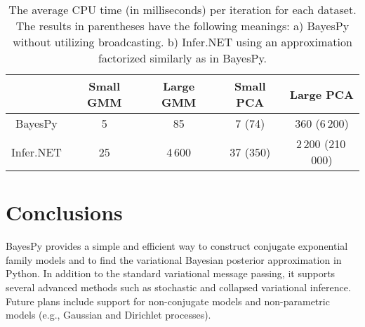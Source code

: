\documentclass[twoside,11pt]{article}
\begin{document}
\begin{table}[tb]
  \centering
  \caption{
    The average CPU time (in milliseconds) per iteration for each
    dataset.  The results in parentheses have the following meanings: a) BayesPy without utilizing
    broadcasting. b) Infer.NET using an approximation factorized similarly as in
    BayesPy.
  }
  \small
  \begin{tabular}{ccccc}
    &
    Small GMM
    &
    Large GMM
    &
    Small PCA
    &
    Large PCA
    \\
    \hline
    BayesPy     & 5 & 85  & 7 (74) & 360 (6\,200)
    \\
    Infer.NET   & 25 & 4\,600 & 37 (350) & 2\,200 (210\,000)
  \end{tabular}
  \label{tab:speed}
\end{table}


\section{Conclusions}

BayesPy provides a simple and efficient way to construct conjugate exponential
family models and to find the variational Bayesian posterior approximation in
Python.
%
In addition to the standard variational message passing, it supports several
advanced methods such as stochastic and collapsed variational inference.  Future
plans include support for non-conjugate models and non-parametric models (e.g.,
Gaussian and Dirichlet processes).







\vskip 0.2in
\small

\end{document}
